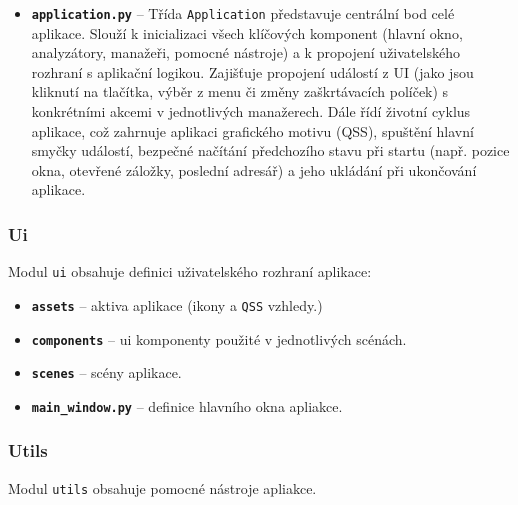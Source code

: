\documentclass[12pt, a4paper]{article}
\begin{document}
\begin{itemize}
    \item \textbf{\texttt{application.py}} -- Třída \texttt{Application} představuje centrální bod celé aplikace. 
    Slouží k inicializaci všech klíčových komponent (hlavní okno, analyzátory, manažeři, pomocné nástroje) 
    a k propojení uživatelského rozhraní s aplikační logikou. Zajišťuje 
    propojení událostí z UI (jako jsou kliknutí na tlačítka, výběr z menu či změny zaškrtávacích políček) 
    s konkrétními akcemi v jednotlivých manažerech. Dále řídí životní cyklus aplikace, což zahrnuje 
    aplikaci grafického motivu (QSS), spuštění hlavní smyčky událostí, bezpečné načítání předchozího stavu 
    při startu (např. pozice okna, otevřené záložky, poslední adresář) a jeho ukládání při ukončování aplikace.

\end{itemize}

\subsubsection{Ui}

Modul \texttt{ui} obsahuje definici uživatelského rozhraní aplikace:

\begin{itemize}
    \item \textbf{\texttt{assets}} -- aktiva aplikace (ikony a \texttt{QSS} vzhledy.)
    \item \textbf{\texttt{components}} -- ui komponenty použité v jednotlivých scénách.
    \item \textbf{\texttt{scenes}} -- scény aplikace.
    \item \textbf{\texttt{main\_window.py}} -- definice hlavního okna apliakce.
\end{itemize}

\subsubsection{Utils}

Modul \texttt{utils} obsahuje pomocné nástroje apliakce.
\end{document}

